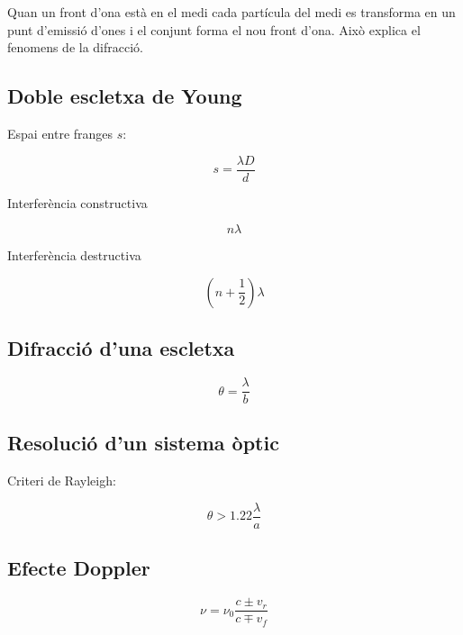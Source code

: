 Quan un front d'ona està en el medi cada partícula del medi es transforma en
un punt d'emissió d'ones i el conjunt forma el nou front d'ona. Això explica el
fenomens de la difracció.

\subsection{Doble escletxa de Young}
\label{sub:doble_escletxa_de_young}

Espai entre franges $s$:

\begin{equation}
    s = \frac{\lambda D}{d}
\end{equation}

Interferència constructiva

\begin{equation}
    n \lambda
\end{equation}

Interferència destructiva

\begin{equation}
    \left( n + \frac{1}{2} \right)\lambda
\end{equation}

\subsection{Difracció d'una escletxa}
\label{sub:difraccio_d_una_escletxa}

\begin{equation}
    \theta = \frac{\lambda}{b}
\end{equation}

\subsection{Resolució d'un sistema òptic}
\label{sub:resolucio_d_un_sistema_optic}

Criteri de Rayleigh:

\begin{equation}
    \theta > 1.22 \frac{\lambda}{a}
\end{equation}

\subsection{Efecte Doppler}
\label{sub:efecte_doppler}

\begin{equation}
    \nu  = \nu_0 \frac{c \pm v_r}{c \mp v_f}
\end{equation}

